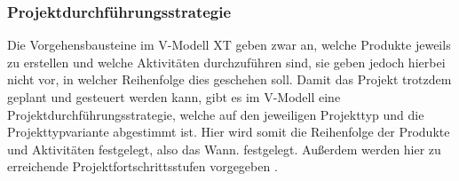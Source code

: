  \subsubsection{Projektdurchführungsstrategie}
 Die Vorgehensbausteine im V-Modell XT geben zwar an, welche Produkte jeweils zu erstellen und welche Aktivitäten durchzuführen sind, sie geben jedoch hierbei nicht vor, in welcher Reihenfolge dies geschehen soll. Damit das Projekt trotzdem geplant und gesteuert werden kann, gibt es im V-Modell eine Projektdurchführungsstrategie, welche auf den jeweiligen Projekttyp und die Projekttypvariante abgestimmt ist. Hier wird somit die Reihenfolge der Produkte und Aktivitäten festgelegt, also das  \grqq Wann\grqq {}. festgelegt. Außerdem werden hier zu erreichende Projektfortschrittsstufen vorgegeben \cite{2004vmodell}. \newline
 
